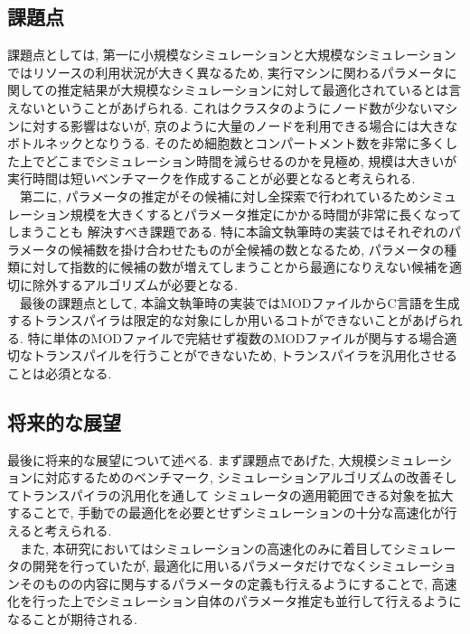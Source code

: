 \subsection{課題点}
課題点としては, 第一に小規模なシミュレーションと大規模なシミュレーションではリソースの利用状況が大きく異なるため,
実行マシンに関わるパラメータに関しての推定結果が大規模なシミュレーションに対して最適化されているとは言えないということがあげられる.
これはクラスタのようにノード数が少ないマシンに対する影響はないが, 京のように大量のノードを利用できる場合には大きなボトルネックとなりうる.
そのため細胞数とコンパートメント数を非常に多くした上でどこまでシミュレーション時間を減らせるのかを見極め,
規模は大きいが実行時間は短いベンチマークを作成することが必要となると考えられる.\\
　第二に, パラメータの推定がその候補に対し全探索で行われているためシミュレーション規模を大きくするとパラメータ推定にかかる時間が非常に長くなってしまうことも
解決すべき課題である. 特に本論文執筆時の実装ではそれぞれのパラメータの候補数を掛け合わせたものが全候補の数となるため,
パラメータの種類に対して指数的に候補の数が増えてしまうことから最適になりえない候補を適切に除外するアルゴリズムが必要となる.\\
　最後の課題点として, 本論文執筆時の実装ではMODファイルからC言語を生成するトランスパイラは限定的な対象にしか用いるコトができないことがあげられる.
特に単体のMODファイルで完結せず複数のMODファイルが関与する場合適切なトランスパイルを行うことができないため,
トランスパイラを汎用化させることは必須となる.\\

\subsection{将来的な展望}
最後に将来的な展望について述べる.
まず課題点であげた, 大規模シミュレーションに対応するためのベンチマーク, シミュレーションアルゴリズムの改善そしてトランスパイラの汎用化を通して
シミュレータの適用範囲できる対象を拡大することで, 手動での最適化を必要とせずシミュレーションの十分な高速化が行えると考えられる.\\
　また, 本研究においてはシミュレーションの高速化のみに着目してシミュレータの開発を行っていたが,
最適化に用いるパラメータだけでなくシミュレーションそのものの内容に関与するパラメータの定義も行えるようにすることで,
高速化を行った上でシミュレーション自体のパラメータ推定も並行して行えるようになることが期待される.\\

